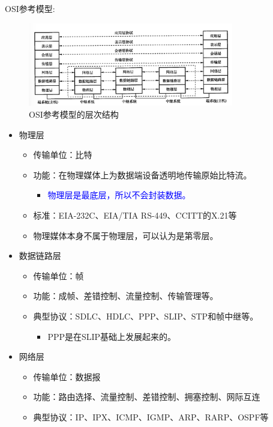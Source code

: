 \documentclass[12pt, a4paper, oneside]{ctexart}
\begin{document}
OSI参考模型:
\begin{figure}
    \centering
    \includegraphics[width=0.8\textwidth]{./images/osi_structure.png}
    \caption{OSI参考模型的层次结构}
\end{figure}
\begin{itemize}
    \item 物理层
    \begin{itemize}
        \item 传输单位：比特
        \item 功能：在物理媒体上为数据端设备透明地传输原始比特流。
        \begin{itemize}
            \item \textcolor{blue}{物理层是最底层，所以不会封装数据。}
        \end{itemize}
        \item 标准：EIA-232C、EIA/TIA RS-449、CCITT的X.21等
        \item 物理媒体本身不属于物理层，可以认为是第零层。
    \end{itemize}
    \item 数据链路层
    \begin{itemize}
        \item 传输单位：帧
        \item 功能：成帧、差错控制、流量控制、传输管理等。
        \item 典型协议：SDLC、HDLC、PPP、SLIP、STP和帧中继等。
        \begin{itemize}
            \item PPP是在SLIP基础上发展起来的。
        \end{itemize}
    \end{itemize}
    \item 网络层
    \begin{itemize}
        \item 传输单位：数据报
        \item 功能：路由选择、流量控制、差错控制、拥塞控制、网际互连
        \item 典型协议：IP、IPX、ICMP、IGMP、ARP、RARP、OSPF等
    \end{itemize}

\end{itemize}
\end{document}
